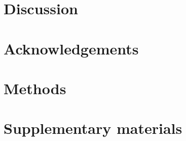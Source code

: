 \documentclass[a4paper,10pt]{article}
\begin{document}



\section{Discussion}


\section{Acknowledgements}

\section{Methods}





\section{Supplementary materials}

\setcounter{table}{0}
\renewcommand{\thetable}{S\arabic{table}}
\setcounter{figure}{0}
\renewcommand{\thefigure}{S\arabic{figure}}
\end{document}
